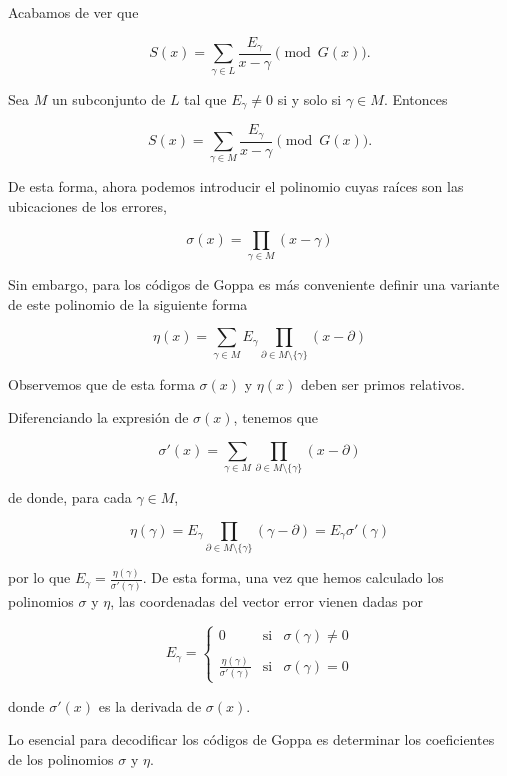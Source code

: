 Acabamos de ver que 

$$S(x) = \sum_{\gamma \in L} \frac{E_\gamma}{x - \gamma} \pmod{G(x)}.$$

Sea $M$ un subconjunto de $L$ tal que $E_{\gamma} \neq 0$ si y solo si $\gamma \in M$. Entonces

$$S(x) = \sum_{\gamma \in M} \frac{E_\gamma}{x - \gamma} \pmod{G(x)}.$$

De esta forma, ahora podemos introducir el polinomio cuyas raíces son las ubicaciones de los errores,

$$\sigma (x) = \prod_{\gamma \in M} (x - \gamma)$$

Sin embargo, para los códigos de Goppa es más conveniente definir una variante de este polinomio de la siguiente forma

$$\eta (x) = \sum_{\gamma \in M} E_\gamma \prod_{\partial \in M \setminus \{ \gamma \} } (x - \partial)$$

Observemos que de esta forma $\sigma(x)$ y $\eta(x)$ deben ser primos relativos.

Diferenciando la expresión de $\sigma(x)$, tenemos que 

$$\sigma'(x) = \sum_{\gamma \in M} \prod_{\partial \in M \setminus \{ \gamma \} } (x - \partial)$$

de donde, para cada $\gamma \in M$,

$$\eta (\gamma) = E_\gamma \prod_{\partial \in M \setminus \{ \gamma \} } (\gamma - \partial) = E_\gamma \sigma'(\gamma)$$

por lo que $E_\gamma = \frac{\eta(\gamma)}{\sigma'(\gamma)}$. De esta forma, una vez que hemos calculado los polinomios $\sigma$ y $\eta$, las coordenadas del vector error vienen dadas por 

\[
    E_\gamma = \left\{ \begin{array}{lcc}
    0 &   \text{si}  & \sigma(\gamma) \neq 0 \\
    \\ \frac{\eta(\gamma)}{\sigma'(\gamma)} &  \text{si} & \sigma(\gamma) = 0
    \end{array}
    \right.
\]

donde $\sigma'(x)$ es la derivada de $\sigma(x)$.

Lo esencial para decodificar los códigos de Goppa es determinar los coeficientes de los polinomios $\sigma$ y $\eta$.